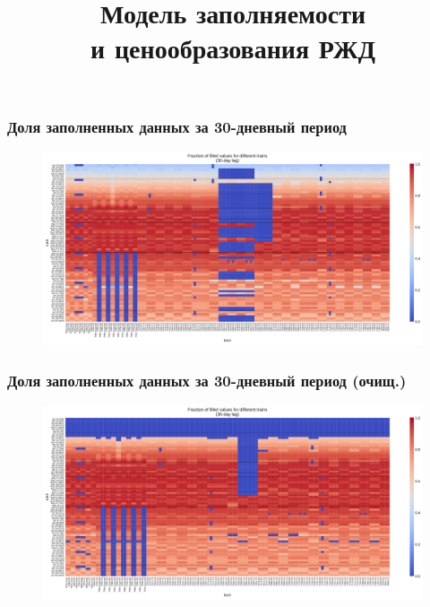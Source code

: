 \documentclass[11pt,aspectratio=169]{beamer}
\title{Модель заполняемости \\ и ценообразования РЖД}
\author{}
\institute{}
\date{}
\begin{document}
\maketitle

\begin{frame}
    \frametitle{Доля заполненных данных за 30-дневный период}

    \begin{figure}
        \centering
        \includegraphics[width=\textwidth]{../data/figures/filled_frac.pdf}
    \end{figure}

\end{frame}


\begin{frame}
    \frametitle{Доля заполненных данных за 30-дневный период (очищ.)}

    \begin{figure}
        \centering
        \includegraphics[width=\textwidth]{../data/figures/filled_frac_clean.pdf}
    \end{figure}

\end{frame}
\end{document}
